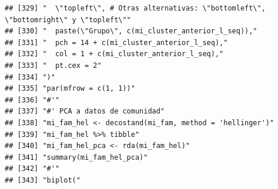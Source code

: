 \documentclass[11pt,]{article}
\begin{document}
\begin{verbatim}
## [329] "  \"topleft\", # Otras alternativas: \"bottomleft\", \"bottomright\" y \"topleft\""                                                                                    
## [330] "  paste(\"Grupo\", c(mi_cluster_anterior_l_seq)),"                                                                                                                     
## [331] "  pch = 14 + c(mi_cluster_anterior_l_seq),"                                                                                                                            
## [332] "  col = 1 + c(mi_cluster_anterior_l_seq),"                                                                                                                             
## [333] "  pt.cex = 2"                                                                                                                                                          
## [334] ")"                                                                                                                                                                     
## [335] "par(mfrow = c(1, 1))"                                                                                                                                                  
## [336] "#'"                                                                                                                                                                    
## [337] "#' PCA a datos de comunidad"                                                                                                                                           
## [338] "mi_fam_hel <- decostand(mi_fam, method = 'hellinger')"                                                                                                                 
## [339] "mi_fam_hel %>% tibble"                                                                                                                                                 
## [340] "mi_fam_hel_pca <- rda(mi_fam_hel)"                                                                                                                                     
## [341] "summary(mi_fam_hel_pca)"                                                                                                                                               
## [342] "#'"                                                                                                                                                                    
## [343] "biplot("                                                                                                                                                               

\end{verbatim}
\end{document}
